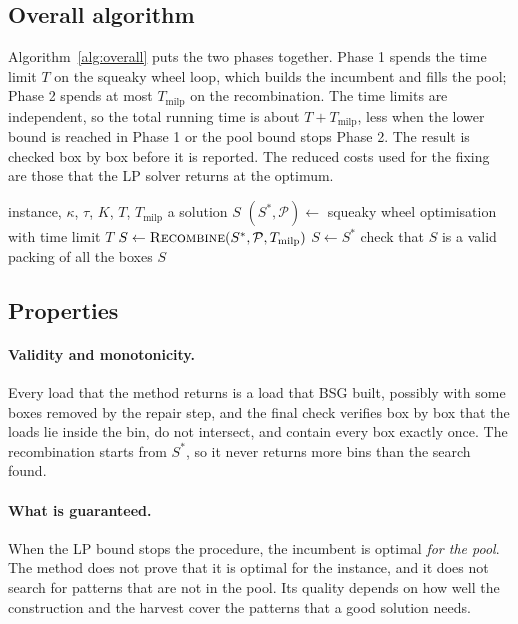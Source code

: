 \subsection{Overall algorithm}
\label{sec:m-overall}

Algorithm~\ref{alg:overall} puts the two phases together. Phase 1 spends the time limit $T$ on the
squeaky wheel loop, which builds the incumbent and fills the pool; Phase 2 spends at most
$T_{\mathrm{milp}}$ on the recombination. The time limits are independent, so the total running time
is about $T+T_{\mathrm{milp}}$, less when the lower bound is reached in Phase 1 or the pool bound
stops Phase 2. The result is checked box by box before it is reported.
The reduced costs used for the fixing are those that the LP solver returns at the optimum.

\begin{algorithm}[t]
\caption{Overall method}
\label{alg:overall}
\begin{algorithmic}[1]
\Require instance, $\kappa$, $\tau$, $K$, $T$, $T_{\mathrm{milp}}$
\Ensure a solution $S$
\State $(S^*,\mathcal{P})\gets$ squeaky wheel optimisation with time limit $T$ 
  \State $S\gets\textsc{Recombine}(S^*,\mathcal{P},T_{\mathrm{milp}})$ 
\Else
  \State $S\gets S^*$
\EndIf
\State check that $S$ is a valid packing of all the boxes
\State \Return $S$
\end{algorithmic}
\end{algorithm}

\subsection{Properties}
\label{sec:m-prop}

\paragraph{Validity and monotonicity.}
Every load that the method returns is a load that BSG built, possibly with some boxes removed
by the repair step, and the final check verifies box by box that the loads lie inside the bin, do
not intersect, and contain every box exactly once. The recombination starts from $S^*$, so it
never returns more bins than the search found.

\paragraph{What is guaranteed.}
When the LP bound stops the procedure, the incumbent is optimal \emph{for the pool}. The method
does not prove that it is optimal for the instance, and it does not search for patterns that are
not in the pool. Its quality depends on how well the construction and the harvest cover the
patterns that a good solution needs.

